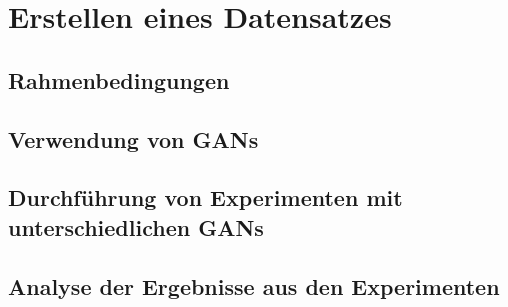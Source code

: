 \chapter{Erstellen eines Datensatzes}\label{chapter:dataset}
\section{Rahmenbedingungen}
\section{Verwendung von GANs}
\section{Durchführung von Experimenten mit unterschiedlichen GANs}
\section{Analyse der Ergebnisse aus den Experimenten}